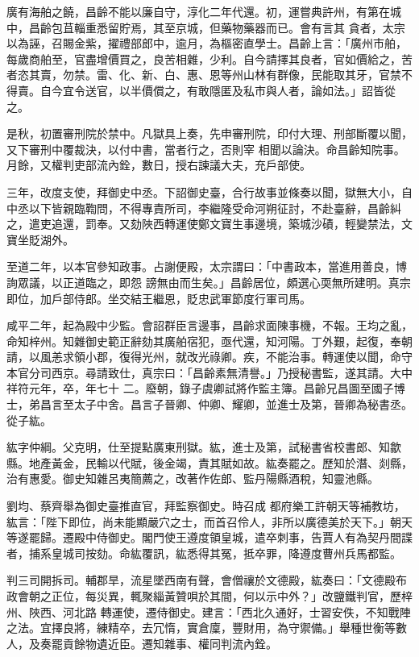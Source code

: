 \begin{pinyinscope}
 廣有海舶之饒，昌齡不能以廉自守，淳化二年代還。初，運嘗典許州，有第在城中，昌齡包苴輜重悉留貯焉，其至京城，但藥物藥器而已。會有言其
 貪者，太宗以為誣，召賜金紫，擢禮部郎中，逾月，為樞密直學士。昌齡上言：「廣州市舶，每歲商舶至，官盡增價買之，良苦相雜，少利。自今請擇其良者，官如價給之，苦者恣其賣，勿禁。雷、化、新、白、惠、恩等州山林有群像，民能取其牙，官禁不得賣。自今宜令送官，以半價償之，有敢隱匿及私市與人者，論如法。」詔皆從之。



 是秋，初置審刑院於禁中。凡獄具上奏，先申審刑院，印付大理、刑部斷覆以聞，又下審刑中覆裁決，以付中書，當者行之，否則宰
 相聞以論決。命昌齡知院事。月餘，又權判吏部流內銓，數日，授右諫議大夫，充戶部使。



 三年，改度支使，拜御史中丞。下詔御史臺，合行故事並條奏以聞，獄無大小，自中丞以下皆親臨鞫問，不得專責所司，李繼隆受命河朔征討，不赴臺辭，昌齡糾之，遣吏追還，罰奉。又劾陜西轉運使鄭文寶生事邊境，築城沙磧，輕變禁法，文寶坐貶湖外。



 至道二年，以本官參知政事。占謝便殿，太宗謂曰：「中書政本，當進用善良，博詢眾議，以正道臨之，即怨
 謗無由而生矣。」昌齡居位，頗選心耎無所建明。真宗即位，加戶部侍郎。坐交結王繼恩，貶忠武軍節度行軍司馬。



 咸平二年，起為殿中少監。會詔群臣言邊事，昌齡求面陳事機，不報。王均之亂，命知梓州。知雜御史範正辭劾其廣舶宿犯，亟代還，知河陽。丁外艱，起復，奉朝請，以風恙求領小郡，復得光州，就改光祿卿。疾，不能治事。轉運使以聞，命守本官分司西京。尋請致仕，真宗曰：「昌齡素無清譽。」乃授秘書監，遂其請。大中祥符元年，卒，年七十
 二。廢朝，錄子虞卿試將作監主簿。昌齡兄昌圖至國子博士，弟昌言至太子中舍。昌言子晉卿、仲卿、耀卿，並進士及第，晉卿為秘書丞。從子紘。



 紘字仲綱。父克明，仕至提點廣東刑獄。紘，進士及第，試秘書省校書郎、知歙縣。地產黃金，民輸以代賦，後金竭，責其賦如故。紘奏罷之。歷知於潛、剡縣，治有惠愛。御史知雜呂夷簡薦之，改著作佐郎、監丹陽縣酒稅，知靈池縣。



 劉均、蔡齊舉為御史臺推直官，拜監察御史。時召成
 都府樂工許朝天等補教坊，紘言：「陛下即位，尚未能顯嚴穴之士，而首召伶人，非所以廣德美於天下。」朝天等遂罷歸。遷殿中侍御史。閣門使王遵度領皇城，遣卒刺事，告賈人有為契丹間諜者，捕系皇城司按劾。命紘覆訊，紘悉得其冤，抵卒罪，降遵度曹州兵馬都監。



 判三司開拆司。輔郡旱，流星墜西南有聲，會僧禳於文德殿，紘奏曰：「文德殿布政會朝之正位，每災異，輒聚緇黃贊唄於其間，何以示中外？」改鹽鐵判官，歷梓州、陜西、河北路
 轉運使，遷侍御史。建言：「西北久通好，士習安佚，不知戰陣之法。宜擇良將，練精卒，去冗惰，實倉廩，豐財用，為守禦備。」舉種世衡等數人，及奏罷貢餘物遺近臣。遷知雜事、權同判流內銓。




\end{pinyinscope}
